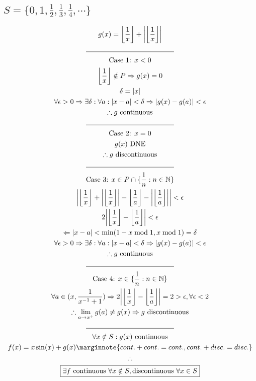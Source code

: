 \documentclass[letterpaper]{article}
\DeclarePairedDelimiter{\floor}{\lfloor}{\rfloor}
\DeclarePairedDelimiter\abs{\lvert}{\rvert}
\begin{document}
\subsection{$S=\{0, 1,\frac{1}{2},\frac{1}{3},\frac{1}{4},\dotsb\}$}
\begin{gather*}
	g(x)=\floor[\bigg]{\frac{1}{x}}+\abs[\bigg]{\floor[\bigg]{\frac{1}{x}}} \\
	\line(1, 0){125} \\
	\text{Case 1: } x<0 \\
	\floor[\bigg]{\frac{1}{x}}\notin P \Rightarrow g(x)=0 \\
	\delta=\abs{x} \\
	\forall \epsilon>0 \Rightarrow\exists\delta:\forall a:\abs{x-a}<\delta\Rightarrow\abs{g(x)-g(a)}<\epsilon \\
	\therefore g\text{ continuous} \\
	\line(1, 0){125} \\
	\text{Case 2: } x=0 \\
	g(x) \text{ DNE} \\
	\therefore g\text{ discontinuous} \\
	\line(1, 0){125} \\
	\text{Case 3: } x\in P\cap\{\frac{1}{n}:n\in\mathbb{N}\} \\
	\abs[\bigg]{\floor[\bigg]{\frac{1}{x}}+\abs[\bigg]{\floor[\bigg]{\frac{1}{x}}}-\floor[\bigg]{\frac{1}{a}}-\abs[\bigg]{\floor[\bigg]{\frac{1}{a}}}}<\epsilon \\
	2\abs[\bigg]{\floor[\bigg]{\frac{1}{x}}-\floor[\bigg]{\frac{1}{a}}}<\epsilon \\
	\Leftarrow \abs{x-a}<\min(1-x\bmod1,x\bmod1)=\delta \\
	\forall \epsilon>0 \Rightarrow\exists\delta:\forall a:\abs{x-a}<\delta\Rightarrow\abs{g(x)-g(a)}<\epsilon \\
	\therefore g\text{ continuous} \\
	\line(1, 0){125} \\
	\text{Case 4: } x\in\{\frac{1}{n}:n\in\mathbb{N}\} \\
	\forall a\in(x,\frac{1}{x^{-1}+1})\Rightarrow2\abs[\bigg]{\floor[\bigg]{\frac{1}{x}}-\floor[\bigg]{\frac{1}{a}}}=2>\epsilon,\forall\epsilon<2 \\
	\therefore \lim_{a\rightarrow x^+}g(a)\neq g(x)\Rightarrow g \text{ discontinuous} \\
	\line(1, 0){125} \\
	\forall x\notin S: g(x)\text{ continuous} \\
	f(x)=x\sin(x)+g(x) \marginnote{cont.+cont.=cont., cont.+disc.=disc.} \\
	\therefore \\
	\boxed{\exists f \text{ continuous } \forall x\notin S,\text{discontinuous } \forall x\in S}
\end{gather*}
\end{document}
